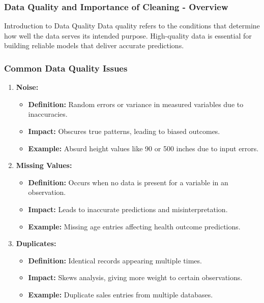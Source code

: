 \documentclass[aspectratio=169]{beamer}
\begin{document}
\begin{frame}[fragile]
    \frametitle{Data Quality and Importance of Cleaning - Overview}
    \begin{block}{Introduction to Data Quality}
        Data quality refers to the conditions that determine how well the data serves its intended purpose. High-quality data is essential for building reliable models that deliver accurate predictions.
    \end{block}
\end{frame}

\begin{frame}[fragile]
    \frametitle{Common Data Quality Issues}
    \begin{enumerate}
        \item \textbf{Noise:}
        \begin{itemize}
            \item \textbf{Definition:} Random errors or variance in measured variables due to inaccuracies.
            \item \textbf{Impact:} Obscures true patterns, leading to biased outcomes.
            \item \textbf{Example:} Absurd height values like 90 or 500 inches due to input errors.
        \end{itemize}
        
        \item \textbf{Missing Values:}
        \begin{itemize}
            \item \textbf{Definition:} Occurs when no data is present for a variable in an observation.
            \item \textbf{Impact:} Leads to inaccurate predictions and misinterpretation.
            \item \textbf{Example:} Missing age entries affecting health outcome predictions.
        \end{itemize}
        
        \item \textbf{Duplicates:}
        \begin{itemize}
            \item \textbf{Definition:} Identical records appearing multiple times.
            \item \textbf{Impact:} Skews analysis, giving more weight to certain observations.
            \item \textbf{Example:} Duplicate sales entries from multiple databases.
        \end{itemize}
    \end{enumerate}
\end{frame}
\end{document}
